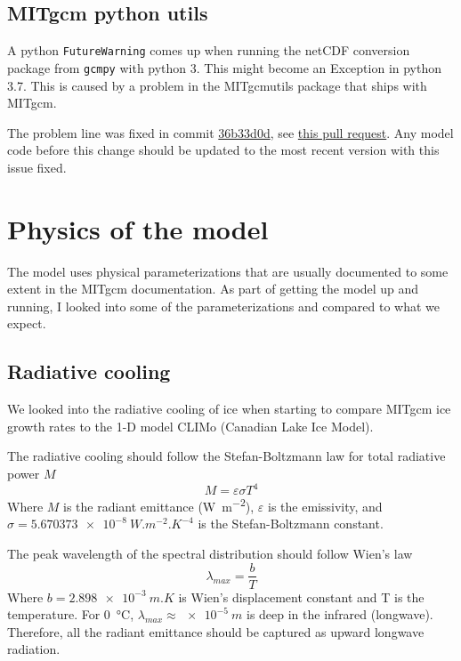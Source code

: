 \documentclass[11pt]{article}
\begin{document}
\subsection{MITgcm python utils}
A python \verb|FutureWarning| comes up when running the netCDF conversion package from \verb|gcmpy| with python 3. This might become an Exception in python 3.7. This is caused by a problem in the MITgcmutils package that ships with MITgcm.

The problem line was fixed in commit \href{https://github.com/MITgcm/MITgcm/commit/36b33d0052b0c72fb6cc21138bf556aa3c96c9f1}{36b33d0d}, see \href{https://github.com/MITgcm/MITgcm/pull/140}{this pull request}. Any model code before this change should be updated to the most recent version with this issue fixed.

\section{Physics of the model}
The model uses physical parameterizations that are usually documented to some extent in the MITgcm documentation. As part of getting the model up and running, I looked into some of the parameterizations and compared to what we expect.

\subsection{Radiative cooling}
We looked into the radiative cooling of ice when starting to compare MITgcm ice growth rates to the 1-D model CLIMo (Canadian Lake Ice Model).

The radiative cooling should follow the Stefan-Boltzmann law for total radiative power $M$
\begin{equation}
M = \varepsilon \sigma T^4
\end{equation}
Where $M$ is the radiant emittance (\si{W.m^{-2}}), $\varepsilon$ is the emissivity, and $\sigma = \SI{5.670373e-8}{W.m^{-2}.K^{-4}}$ is the Stefan-Boltzmann constant.

The peak wavelength of the spectral distribution should follow Wien's law
\begin{equation}
\lambda_{max} = \frac{b}{T}
\end{equation}
Where $b = \SI{2.898e-3}{m.K}$ is Wien's displacement constant and T is the temperature. For \SI{0}{\celsius}, $\lambda_{max} \approx \SI{e-5}{m}$ is deep in the infrared (longwave). Therefore, all the radiant emittance should be captured as upward longwave radiation.
\end{document}
